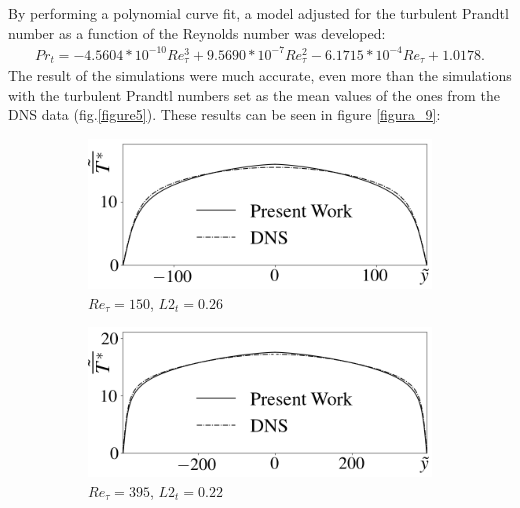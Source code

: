 \documentclass[10pt]{article} %
\begin{document}
By performing a polynomial curve fit, a model adjusted for the turbulent Prandtl number as a function of the Reynolds number was developed:
\begin{equation}
\begin{split}
Pr_t = -4.5604 * 10^{-10} Re_\tau^3 + 9.5690 * 10^{-7} Re_\tau^2 - 6.1715 *10 ^{-4} Re_\tau + 1.0178 .
\end{split}
\end{equation}
The result of the simulations were much accurate, even more than the simulations with the turbulent Prandtl numbers set as the mean values of the ones from the DNS data (fig.\ref{figure5}). These results can be seen in figure \ref{figura_9}:



\begin{figure}[!h]
	\centering
	\begin{subfigure}[t]{0.5\textwidth}
		\centering
		\includegraphics[angle=0, scale=0.24]{fotos_formatacao_final/Temperature_150_071_Prt(Ret)_A26}
		\caption{$Re_\tau = 150$, $L2_t = 0.26$}
	\end{subfigure}
	\begin{subfigure}[t]{0.45\textwidth}
		\centering
		\includegraphics[angle=0, scale=0.24]{fotos_formatacao_final/Temperature_395_071_Prt(Ret)_A26}
		\caption{$Re_\tau = 395$, $L2_t = 0.22$}
	\end{subfigure}
	\begin{subfigure}[t]{0.5\textwidth}

\end{subfigure}
\end{figure}
\end{document}
